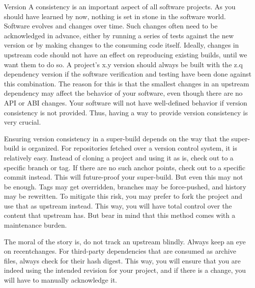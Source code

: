 Version A consistency is an important aspect of all software projects. As you should have learned by now, nothing is set in stone in the software world. Software evolves and changes over time. Such changes often need to be acknowledged in advance, either by running a series of tests against the new version or by making changes to the consuming code itself. Ideally, changes in upstream code should not have an effect on reproducing existing builds, until we want them to do so. A project's x.y version should always be built with the z.q dependency version if the software verification and testing have been done against this combination. The reason for this is that the smallest changes in an upstream dependency may affect the behavior of your software, even though there are no API or ABI changes. Your software will not have well-defined behavior if version consistency is not provided. Thus, having a way to provide version consistency is very crucial.

Ensuring version consistency in a super-build depends on the way that the super-build is organized. For repositories fetched over a version control system, it is relatively easy. Instead of cloning a project and using it as is, check out to a specific branch or tag. If there are no such anchor points, check out to a specific commit instead. This will future-proof your super-build. But even this may not be enough. Tags may get overridden, branches may be force-pushed, and history may be rewritten. To mitigate this risk, you may prefer to fork the project and use that as upstream instead. This way, you will have total control over the content that upstream has. But bear in mind that this method comes with a maintenance burden.

The moral of the story is, do not track an upstream blindly. Always keep an eye on recentchanges. For third-party dependencies that are consumed as archive files, always check for their hash digest. This way, you will ensure that you are indeed using the intended revision for your project, and if there is a change, you will have to manually acknowledge it.












































